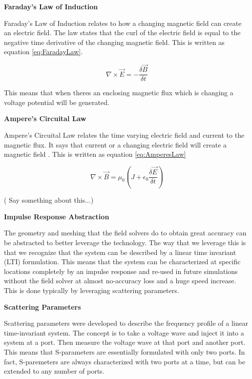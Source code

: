 \documentclass{book}
\begin{document}
\textbf{Faraday's Law of Induction}

Faraday's Law of Induction relates to how a changing magnetic field can create an electric field.  The law states that the curl of the electric field is equal to  the negative time derivative of the changing magnetic field. This is written as equation \ref{eq:FaradayLaw}.

\begin{equation} \label{eq:FaradayLaw}
\nabla \times \vec{E} = - \frac{\delta \vec{B}}{\delta t}
\end{equation}


This means that when theres an enclosing magnetic flux which is changing a voltage potential will be generated.

\textbf{Ampere's Circuital Law}

Ampere's Circuital Law relates the time varying electric field and current to the magnetic flux.  It says that current or a changing electric field will create a magnetic field .  This is written as equation \ref{eq:AmperesLaw}

\begin{equation} \label{eq:AmperesLaw}
\nabla \times \vec{B} = \mu_{0} \left(J + \epsilon_{0} \frac{\delta  \vec{E}}{\delta t} \right) 
\end{equation}

( Say something about this...)

\textbf{Impulse Response Abstraction}

The geometry and meshing that the field solvers do to obtain great accuracy can be abstracted to better leverage the technology.  The way that we leverage this is that we recognize that the system can be described by a linear time invariant (LTI) formulation.  This means that the system can be characterized at specific locations completely by an impulse response and re-used in future simulations without the field solver at almost no-accuracy loss and a huge speed increase.  This is done typically by leveraging scattering parameters.

\textbf{Scattering Parameters} 

Scattering parameters were developed to describe the frequency profile of a linear time-invariant system.  The concept is to take a voltage wave and inject it into a system at a port. Then measure the voltage wave at that port and another port.  This means that S-parameters are essentially formulated with only two ports.  In fact, S-paremeters are always characterized with two ports at a time, but can be extended to any number of ports.
\end{document}
